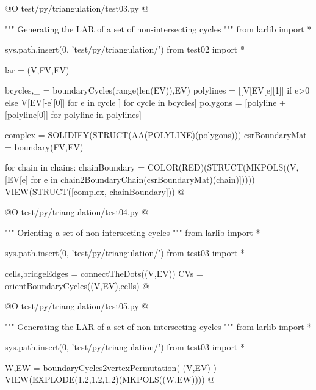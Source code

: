 \documentclass[11pt,oneside]{article}    %
\begin{document}
@O test/py/triangulation/test03.py
@{""" Generating the LAR of a set of non-intersecting cycles """
from larlib import *

sys.path.insert(0, 'test/py/triangulation/')
from test02 import *

lar = (V,FV,EV)

bcycles,_ = boundaryCycles(range(len(EV)),EV)
polylines = [[V[EV[e][1]] if e>0 else V[EV[-e][0]] for e in cycle ] for cycle in bcycles]
polygons = [polyline + [polyline[0]] for polyline in polylines]

complex = SOLIDIFY(STRUCT(AA(POLYLINE)(polygons)))
csrBoundaryMat = boundary(FV,EV)

for chain in chains:
    chainBoundary = COLOR(RED)(STRUCT(MKPOLS((V,[EV[e] 
                        for e in chain2BoundaryChain(csrBoundaryMat)(chain)]))))
    VIEW(STRUCT([complex, chainBoundary]))
@}

@O test/py/triangulation/test04.py
@{""" Orienting a set of non-intersecting cycles """
from larlib import *

sys.path.insert(0, 'test/py/triangulation/')
from test03 import *

cells,bridgeEdges = connectTheDots((V,EV))
CVs = orientBoundaryCycles((V,EV),cells)
@}

@O test/py/triangulation/test05.py
@{""" Generating the LAR of a set of non-intersecting cycles """
from larlib import *

sys.path.insert(0, 'test/py/triangulation/')
from test03 import *

W,EW = boundaryCycles2vertexPermutation( (V,EV) )
VIEW(EXPLODE(1.2,1.2,1.2)(MKPOLS((W,EW))))
@}
\end{document}
